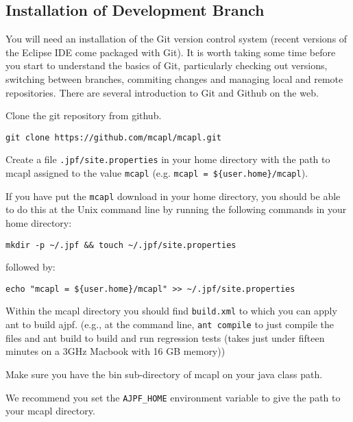\subsection{Installation of Development Branch}

You will need an installation of the Git version control system (recent versions of the Eclipse IDE come packaged with Git).  It is worth taking some time before you start to understand the basics of Git, particularly checking out versions, switching between branches, commiting changes and managing local and remote repositories.  There are several introduction to Git and Github on the web.

\begin{itemize}
\begin{sloppypar}
\item Clone the git repository from github. 
\begin{small}
\begin{verbatim}
git clone https://github.com/mcapl/mcapl.git
\end{verbatim}
\end{small}
\end{sloppypar}
\item Create a file \texttt{.jpf/site.properties} in your home directory with the path to mcapl assigned to the value \texttt{mcapl} (e.g. \texttt{mcapl = \$\{user.home\}/mcapl}).

If you have put the \texttt{mcapl} download in your home directory, you should be able to do this at the Unix command line by running the following commands in your home directory:

\begin{verbatim}
mkdir -p ~/.jpf && touch ~/.jpf/site.properties
\end{verbatim}
followed by:
\begin{verbatim}
echo "mcapl = ${user.home}/mcapl" >> ~/.jpf/site.properties
\end{verbatim}

\item Within the mcapl directory you should find \texttt{build.xml} to which you can apply ant to build ajpf. (e.g., at the command line, \lstinline{ant compile} to just compile the files and ant build to build and run regression tests (takes just under fifteen minutes on a 3GHz Macbook with 16 GB memory))
\item Make sure you have the bin sub-directory of mcapl on your java class path.
\item We recommend you set the \texttt{AJPF\_HOME} environment variable to give the path to your mcapl directory.
\end{itemize}

